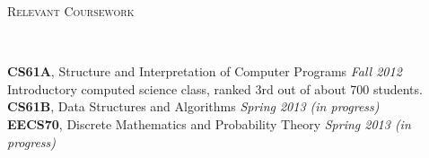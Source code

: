 \documentclass[9pt]{article}
\newenvironment{changemargin}[2]{%
  \begin{list}{}{%
      \setlength{\topsep}{0pt}%
      \setlength{\leftmargin}{#1}%
      \setlength{\rightmargin}{#2}%
      \setlength{\listparindent}{\parindent}%
      \setlength{\itemindent}{\parindent}%
      \setlength{\parsep}{\parskip}%
    }%
  \item[]}{\end{list}
}
\newcommand{\lineover}{
  \begin{changemargin}{-0.05in}{-0.05in}
    \vspace*{-8pt}
    \hrulefill \\
    \vspace*{-2pt}
  \end{changemargin}
}
\newcommand{\header}[1]{
  \begin{changemargin}{-0.5in}{-0.5in}
    \scshape{#1}\\
    \lineover
  \end{changemargin}
}
\newenvironment{body} {
  \vspace*{-16pt}
  \begin{changemargin}{-0.25in}{-0.5in}
  }	
  {\end{changemargin}
}
\begin{document}
\smallskip

\header{Relevant Coursework}

\begin{body}
  \vspace{14pt}
  \textbf{CS61A}, Structure and Interpretation of Computer Programs \hfill {} \emph{Fall 2012}\\
  Introductory computed science class, ranked 3rd out of about 700 students.\\
  \medskip
  \textbf{CS61B}, Data Structures and Algorithms \hfill {} \emph{Spring 2013 (in progress)}\\
  \medskip
  \textbf{EECS70}, Discrete Mathematics and Probability Theory \hfill {} \emph{Spring 2013 (in progress)}
\end{body}
\end{document}
